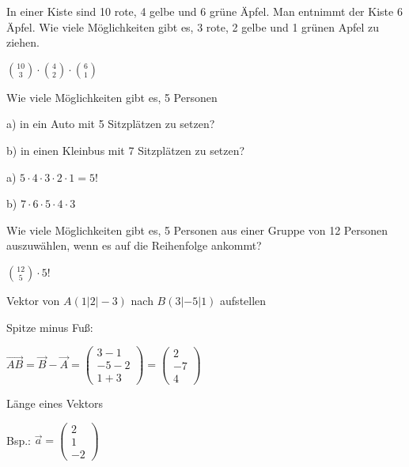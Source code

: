 \documentclass[paper=a6,landscape,ngerman,twoside=true,fontsize=12pt]{scrartcl}
\begin{document}
\begin{frage}
	\LARGE
	In einer Kiste sind 10 rote, 4 gelbe und 6 grüne Äpfel. Man entnimmt der Kiste 6 Äpfel. Wie viele Möglichkeiten gibt es, 3 rote, 2 gelbe und 1 grünen Apfel zu ziehen. 
	
\end{frage}
\begin{antwort}
	\LARGE
	$\binom{10}{3} \cdot \binom{4}{2} \cdot \binom{6}{1}$
\end{antwort}	
\begin{frage}
	\LARGE
	Wie viele Möglichkeiten gibt es, 5 Personen 
	
	\hspace{0.3cm}a) in ein Auto mit 5 Sitzplätzen zu setzen?
	
	\hspace{-0.25cm}b) in einen Kleinbus mit 7 Sitzplätzen zu setzen?
	
\end{frage}
\begin{antwort}
	\LARGE
	\hspace{1.3cm}	a) $5 \cdot 4 \cdot 3\cdot 2 \cdot 1=5!$
	
	b) $7 \cdot 6 \cdot 5\cdot 4 \cdot 3$
\end{antwort}	
\begin{frage}
	\LARGE
	Wie viele Möglichkeiten gibt es, 5 Personen aus einer Gruppe von 12 Personen auszuwählen, wenn
	es auf die Reihenfolge ankommt?
\end{frage}
\begin{antwort}
	\LARGE
	$\binom{12}{5} \cdot 5!$
\end{antwort}	
\begin{frage}
	Vektor von $A(1|2|-3)$ nach $B(3|-5|1)$ aufstellen
\end{frage}
\begin{antwort}
	Spitze minus Fuß:
	
	\bigskip		
		$\vec{AB}=\vec{B}-\vec{A}=\left(\begin{array}{c} 3-1 \\ -5-2 \\ 1+3\end{array} \right)=\left(\begin{array}{c} 2 \\ -7 \\ 4\end{array} \right)$
		
\end{antwort}		
\begin{frage}
	Länge eines Vektors
	
	Bsp.: $\vec{a}=\left(\begin{array}{c} 2 \\ 1 \\ -2\end{array} \right)$
\end{frage}
\end{document}
